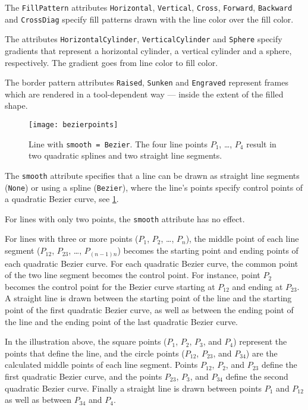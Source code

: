 The \lstinline!FillPattern! attributes \lstinline!Horizontal!, \lstinline!Vertical!, \lstinline!Cross!, \lstinline!Forward!, \lstinline!Backward! and \lstinline!CrossDiag! specify fill patterns drawn with the line color over the fill color.

The attributes \lstinline!HorizontalCylinder!, \lstinline!VerticalCylinder! and \lstinline!Sphere! specify
gradients that represent a horizontal cylinder, a vertical cylinder and
a sphere, respectively. The gradient goes from line color to fill color.

The border pattern attributes \lstinline!Raised!, \lstinline!Sunken! and \lstinline!Engraved! represent frames which are rendered in a tool-dependent way --- inside the extent of the filled shape.

\begin{figure}[H]
  \begin{center}
    \texttt{[image: bezierpoints]}
  \end{center}
  \caption{Line with \lstinline!smooth = Bezier!.  The four line points $P_{1}$, \ldots{}, $P_{4}$ result in two quadratic splines and two straight line segments.}\label{fig:smooth-bezier}
\end{figure}

The \lstinline!smooth! attribute specifies that a line can be drawn as straight line segments (\lstinline!None!) or using a spline (\lstinline!Bezier!), where the line's points specify control points of a quadratic Bezier curve, see \cref{fig:smooth-bezier}.

For lines with only two points, the \lstinline!smooth! attribute has no effect.

For lines with three or more points ($P_{1}$, $P_{2}$, \ldots{}, $P_{n}$), the middle point of each line segment ($P_{12}$, $P_{23}$, \ldots{}, $P_{(n-1)n}$) becomes the starting point and ending
points of each quadratic Bezier curve.  For each quadratic Bezier curve, the common point of the two line segment becomes the control point. For instance, point $P_{2}$ becomes the control point for
the Bezier curve starting at $P_{12}$ and ending at $P_{23}$.  A straight line is drawn between the starting point of the line and the starting point of the first quadratic Bezier curve, as well as
between the ending point of the line and the ending point of the last quadratic Bezier curve.

In the illustration above, the square points ($P_{1}$, $P_{2}$, $P_{3}$, and $P_{4}$) represent the points that define the line, and the circle points ($P_{12}$, $P_{23}$, and $P_{34}$) are the
calculated middle points of each line segment.  Points $P_{12}$, $P_{2}$, and $P_{23}$ define the first quadratic Bezier curve, and the points $P_{23}$, $P_{3}$, and $P_{34}$ define the second
quadratic Bezier curve.  Finally a straight line is drawn between points $P_{1}$ and $P_{12}$ as well as between $P_{34}$ and $P_{4}$.

